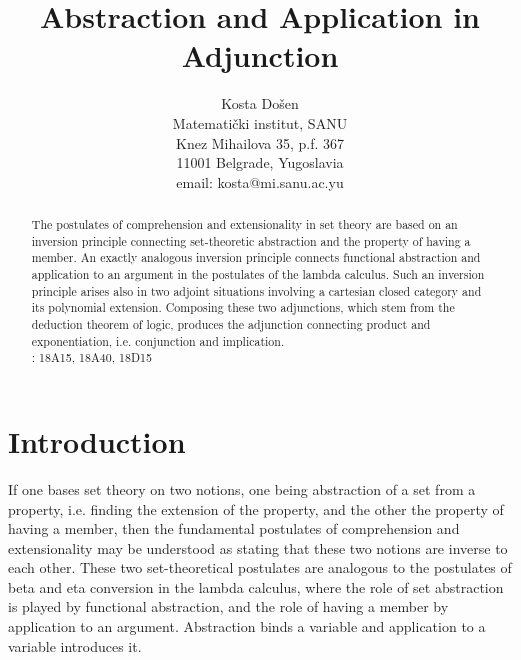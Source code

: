 




\title{{\bf Abstraction and Application in Adjunction}}
\author{{\sc Kosta Do\v sen} \\
Matemati\v {c}ki institut, SANU\\
Knez Mihailova 35, p.f. 367 \\
11001 Belgrade, Yugoslavia \\
email: kosta@mi.sanu.ac.yu}
\date{}
\maketitle

\begin{abstract}
\noindent The postulates of comprehension and extensionality in set theory
are based on an inversion principle connecting set-theoretic abstraction and
the property of having a member. An exactly analogous inversion principle
connects functional abstraction and application to an argument in the
postulates of the lambda calculus. Such an inversion principle arises also
in two adjoint situations involving a cartesian closed category and its
polynomial extension. Composing these two adjunctions, which stem from the
deduction theorem of logic, produces the adjunction connecting product and
exponentiation, i.e. conjunction and implication.\\[0.2cm]
: 18A15, 18A40, 18D15
\end{abstract}

\section{Introduction}

\noindent If one bases set theory on two notions, one being abstraction of a
set from a property, i.e. finding the extension of the property, and the
other the property of having a member, then the fundamental postulates of
comprehension and extensionality may be understood as stating that these two
notions are inverse to each other. These two set-theoretical postulates are
analogous to the postulates of beta and eta conversion in the lambda
calculus, where the role of set abstraction is played by functional
abstraction, and the role of having a member by application to an argument.
Abstraction binds a variable and application to a variable introduces it.

